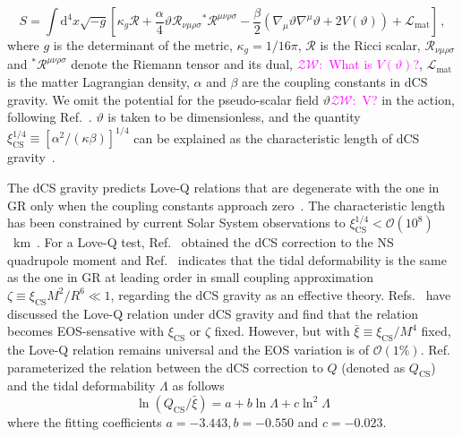 \documentclass[a4paper,11pt]{article}
\newcommand{\ZW}[1]{\textcolor{magenta}{$\mathcal{ZW}$:~#1}}
\begin{document}
\begin{equation}
   \label{cs_action}
   S = \int \mathrm{d}^4 x \sqrt{-g}\left[ \kappa_g \mathcal{R} + \frac{\alpha}{4} \mathcal{\vartheta} \mathcal{R}_{\nu\mu\rho\sigma} {}^{*}\mathcal{R}^{\mu\nu\rho\sigma} - \frac{\beta}{2}\left(\nabla_{\mu}\mathcal{\vartheta}\nabla^{\mu}\mathcal{\vartheta}+2V(\mathcal{\vartheta})\right) + \mathcal{L}_{\mathrm{mat}}\right]\,,
\end{equation}
where $g$ is the determinant of the metric, $\kappa_g= 1/16\pi$, $\mathcal{R}$ is 
the Ricci scalar, $\mathcal{R}_{\nu\mu\rho\sigma}$ and
$^{*}\mathcal{R}^{\mu\nu\rho\sigma}$ denote the Riemann tensor and its dual,
\ZW{What is $V(\mathcal{\vartheta})$?},
$\mathcal{L}_{\mathrm{mat}}$ is the matter Lagrangian density,
$\alpha$ and $\beta$ are the coupling constants in dCS gravity. We omit the 
potential for the pseudo-scalar field $\mathcal{\vartheta}$\ZW{V?} in the action, 
following Ref.~\cite{Gupta:2017vsl}. $\mathcal{\vartheta}$ is taken to be 
dimensionless, and the quantity $\xi_{\mathrm{CS}}^{1/4} \equiv [\alpha^2/
(\kappa\beta)]^{1/4}$ can be explained as 
the characteristic length of dCS gravity~\cite{Yunes:2009hc,Yagi:2012ya}. 

The dCS gravity predicts Love-Q relations that are degenerate with the one in GR 
only when the coupling constants approach zero~\cite{Yagi:2013bca,
Yagi:2013awa,Gupta:2017vsl}. The characteristic length has been constrained by 
current Solar System observations to $\xi_{\mathrm{CS}}^{1/4}<\mathcal{O}(10^8)$~km~\cite{Ali-Haimoud:2011zme,Yagi:2012ya}. 
For a Love-Q test, Ref.~\cite{Yagi:2013mbt} obtained the dCS correction to the NS 
quadrupole moment and Ref.~\cite{Yagi:2011xp} indicates that the tidal 
deformability is the same as the one in GR at leading order in small coupling 
approximation $\zeta \equiv \xi_{\mathrm{CS}} M^2/R^6 \ll 1$, regarding the dCS 
gravity as an effective theory. Refs.~\cite{Yagi_2017,Yagi:2013mbt,Gupta:2017vsl} 
have discussed the Love-Q relation under dCS gravity and find that the relation 
becomes EOS-sensative with $\xi_{\mathrm{CS}}$ or $\zeta$ fixed. However, but with 
$\bar{\xi}\equiv \xi_{\mathrm{CS}}/M^4$ fixed, the Love-Q relation remains 
universal and the EOS variation is of $\mathcal{O}(1\%)$. Ref.~\cite{Gupta:2017vsl} 
parameterized the relation between the dCS correction to $Q$ (denoted as $Q_{\mathrm{CS}}$) and the tidal deformability $\Lambda$ as follows
\begin{equation}
    \label{cs_Love_Q_eq}
    \ln (Q_{\mathrm{CS}}/\bar{\xi}) = a + b \ln \Lambda + c \ln^{2} \Lambda
\end{equation} 
where the fitting coefficients $a=-3.443, b=-0.550$ and $c=-0.023$. 
\end{document}
